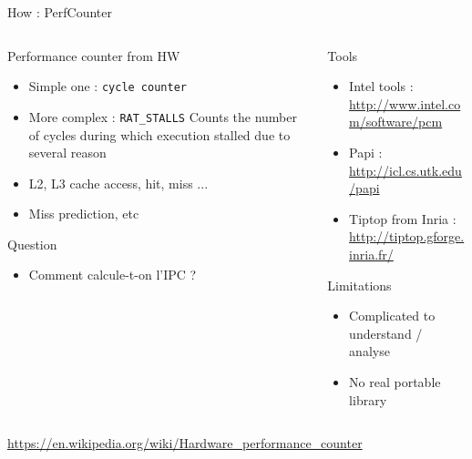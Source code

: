 %
\begin{Frame}{How : PerfCounter}
  \begin{columns}[t]
    \begin{column}{5.5cm} %
      \begin{block}{Performance counter from HW}
        \begin{itemize}
        \item Simple one : \texttt{cycle counter}
        \item More complex : \texttt{RAT\_STALLS} Counts the number of cycles during which execution stalled due to several reason
        \item L2, L3 cache access, hit, miss ...
        \item Miss prediction, etc
        \end{itemize}
      \end{block} 
      \begin{alertblock}{Question}
        \begin{itemize}
        \item Comment calcule-t-on l'IPC ?
        \end{itemize}
      \end{alertblock}
    \end{column}
    
    \begin{column}{5.5cm} %
      \begin{block}{Tools}
        \begin{itemize}
        \item Intel tools : \url{http://www.intel.com/software/pcm}
        \item Papi : \url{http://icl.cs.utk.edu/papi}
        \item Tiptop from Inria : \url{http://tiptop.gforge.inria.fr/}
        \end{itemize}
      \end{block}   
      \begin{alertblock}{Limitations}
        \begin{itemize}
        \item Complicated to understand / analyse
        \item No real portable library
        \end{itemize}
      \end{alertblock}   
    \end{column}
  \end{columns}  
\url{https://en.wikipedia.org/wiki/Hardware_performance_counter}
\end{Frame}


